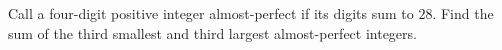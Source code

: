 Call a four-digit positive integer almost-perfect if its digits sum to $28$. Find the sum of the third smallest and third largest almost-perfect integers.

